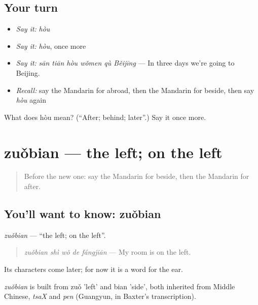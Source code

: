 \subsection*{Your turn}
\begin{itemize}
\raggedright
  \item \emph{Say it:} \emph{hòu}
  \item \emph{Say it:} \emph{hòu}, once more
  \item \emph{Say it:} \emph{sān tiān hòu wǒmen qù Běijīng} — In three days we're going to Beijing.
  \item \emph{Recall:} say the Mandarin for abroad, then the Mandarin for beside, then say \emph{hòu} again
\end{itemize}

\begin{tcolorbox}[breakable,colback=teal!4,colframe=teal!35!black,title={Before you move on}]
What does hòu mean? (\textquotedblleft{}After; behind; later\textquotedblright{}.) Say it once more.
\end{tcolorbox}
\section[zuǒbian]{zuǒbian — the left; on the left}

\label{lesson:ZH-C82-zuobian}



\begin{quote}
Before the new one: say the Mandarin for beside, then the Mandarin for after.
\end{quote}

\subsection*{You'll want to know: zuǒbian}
\emph{zuǒbian} — \textquotedblleft{}the left; on the left\textquotedblright{}.

\begin{quote}
\emph{zuǒbian shì wǒ de fángjiān} — My room is on the left.
\end{quote}

Its characters come later; for now it is a word for the ear.

\begin{cousinweb}
\emph{zuǒbian} is built from zuǒ 'left' and bian 'side', both inherited from Middle Chinese, \emph{tsaX} and \emph{pen} (Guangyun, in Baxter's transcription).
\end{cousinweb}

